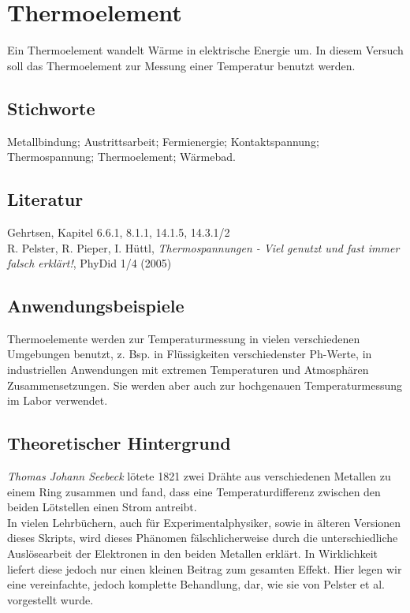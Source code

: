 \chapter{Thermoelement}
\label{v:11}

Ein Thermoelement wandelt Wärme in elektrische Energie um. In diesem Versuch soll das Thermoelement zur Messung einer Temperatur benutzt werden.

\section{Stichworte}

Metallbindung; Austrittsarbeit; Fermienergie; Kontaktspannung; Thermospannung; Thermoelement; Wärmebad.
%
\section{Literatur}

Gehrtsen, Kapitel 6.6.1, 8.1.1, 14.1.5, 14.3.1/2\\
R. Pelster, R. Pieper, I. Hüttl, \textit{Thermospannungen - Viel genutzt und fast immer falsch erklärt!}, PhyDid 1/4 (2005)

\section{Anwendungsbeispiele}

Thermoelemente werden zur Temperaturmessung in vielen verschiedenen Umgebungen benutzt, z. Bsp. in Flüssigkeiten verschiedenster Ph-Werte, in industriellen Anwendungen mit extremen Temperaturen und Atmosphären Zusammensetzungen. Sie werden aber auch zur hochgenauen Temperaturmessung im Labor verwendet.

\section{Theoretischer Hintergrund}

\textit{Thomas Johann Seebeck} lötete 1821 zwei Drähte aus verschiedenen Metallen zu einem Ring zusammen und fand, dass eine Temperaturdifferenz zwischen den beiden Lötstellen einen Strom antreibt.\\
In vielen Lehrbüchern, auch für Experimentalphysiker, sowie in älteren Versionen dieses Skripts, wird dieses Phänomen fälschlicherweise durch die unterschiedliche Auslösearbeit der Elektronen in den beiden Metallen erklärt. In Wirklichkeit liefert diese jedoch nur einen kleinen Beitrag zum gesamten Effekt. Hier legen wir eine vereinfachte, jedoch komplette Behandlung, dar, wie sie von Pelster et al. vorgestellt wurde.

